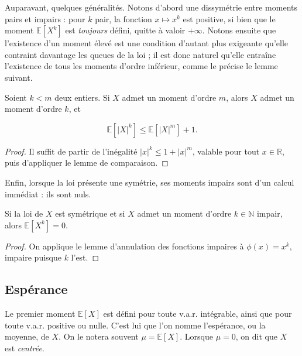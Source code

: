 Auparavant, quelques généralités. Notons d'abord une dissymétrie entre moments pairs et impairs : pour $k$ pair, la fonction $x \mapsto x^k$ est positive, si bien que le moment $\mathbb{E}[X^k]$ est \emph{toujours} défini, quitte à valoir $+\infty$. Notons ensuite que l'existence d'un moment élevé est une condition d'autant plus exigeante qu'elle contraint davantage les queues de la loi ; il est donc naturel qu'elle entraîne l'existence de tous les moments d'ordre inférieur, comme le précise le lemme suivant.

\medskip

\begin{mdframed}
\begin{lemme}
Soient $k < m$ deux entiers. Si $X$ admet un moment d'ordre $m$, alors $X$ admet un moment d'ordre $k$, et

$$
\mathbb{E}[|X|^k] \leq \mathbb{E}[|X|^m] + 1.
$$
\end{lemme}
\end{mdframed}

\begin{proof}
Il suffit de partir de l'inégalité $|x|^k \leq 1 + |x|^m$, valable pour tout $x \in \mathbb{R}$, puis d'appliquer le lemme de comparaison.
\end{proof}

Enfin, lorsque la loi présente une symétrie, ses moments impairs sont d'un calcul immédiat : ils sont nuls.

\medskip

\begin{mdframed}
\begin{lemme}
Si la loi de $X$ est symétrique et si $X$ admet un moment d'ordre $k \in \mathbb{N}$ impair, alors $\mathbb{E}[X^k] = 0$.
\end{lemme}
\end{mdframed}

\begin{proof}
On applique le lemme d'annulation des fonctions impaires à $\phi(x) = x^k$, impaire puisque $k$ l'est.
\end{proof}

\subsection{Espérance}

Le premier moment $\mathbb{E}[X]$ est défini pour toute v.a.r. intégrable, ainsi que pour toute v.a.r. positive ou nulle. C'est lui que l'on nomme l'espérance, ou la moyenne, de $X$. On le notera souvent $\mu = \mathbb{E}[X]$. Lorsque $\mu = 0$, on dit que $X$ est \emph{centrée}.

